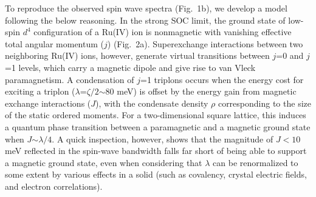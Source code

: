 To reproduce the observed spin wave spectra (Fig.~1b), we develop a model following the below reasoning. In the strong SOC limit, the ground state of low-spin $d^4$ configuration of a Ru(IV) ion is nonmagnetic with vanishing effective total angular momentum ($j$) (Fig.~2a). Superexchange interactions between two neighboring Ru(IV) ions, however, generate virtual transitions between $j$=0 and $j$=1 levels, which carry a magnetic dipole and give rise to van Vleck paramagnetism. A condensation of $j$=1 triplons occurs when the energy cost for exciting a triplon ($\lambda$=$\zeta/2$$\sim$80 meV) is offset by the energy gain from magnetic exchange interactions ($J$), with the condensate density $\rho$ corresponding to the size of the static ordered moments. For a two-dimensional square lattice, this induces a quantum phase transition between a paramagnetic and a magnetic ground state when $J$$\sim$$\lambda/4$. A quick inspection, however, shows that the magnitude of $J< 10$ meV reflected in the spin-wave bandwidth falls far short of being able to support a magnetic ground state, even when considering that $\lambda$ can be renormalized to some extent by various effects in a solid (such as covalency, crystal electric fields, and electron correlations).